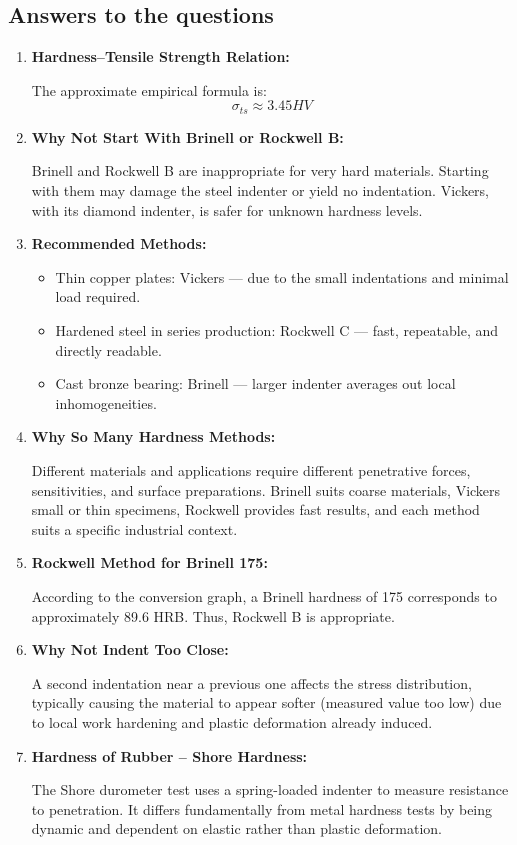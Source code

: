 \documentclass[a4paper]{article}
\begin{document}
  \subsection{Answers to the questions}
  \begin{enumerate}
    \item \textbf{Hardness–Tensile Strength Relation:}
    
    The approximate empirical formula is:
    \begin{equation}
      \sigma _{ts} \approx 3.45 HV
    \end{equation}
    \item \textbf{Why Not Start With Brinell or Rockwell B:}
    
    Brinell and Rockwell B are inappropriate for very hard materials. Starting
    with them may damage the steel indenter or yield no indentation. Vickers,
    with its diamond indenter, is safer for unknown hardness levels.
    \item \textbf{Recommended Methods:}
    
    \begin{itemize}
      \item Thin copper plates: Vickers — due to the small indentations and minimal load required.
      \item Hardened steel in series production: Rockwell C — fast, repeatable, and directly readable.
      \item Cast bronze bearing: Brinell — larger indenter averages out local inhomogeneities.
    \end{itemize}
    \item \textbf{Why So Many Hardness Methods:}
    
    Different materials and applications require different penetrative forces,
    sensitivities, and surface preparations. Brinell suits coarse materials,
    Vickers small or thin specimens, Rockwell provides fast results, and each
    method suits a specific industrial context.
    
    \item \textbf{Rockwell Method for Brinell 175:}
    
    According to the conversion graph, a Brinell hardness of 175 corresponds to
    approximately 89.6 HRB. Thus, Rockwell B is appropriate.

    \item \textbf{Why Not Indent Too Close:}
    
    A second indentation near a previous one affects the stress distribution,
    typically causing the material to appear softer (measured value too low) due
    to local work hardening and plastic deformation already induced.
    
    \item \textbf{Hardness of Rubber – Shore Hardness:}
    
    The Shore durometer test uses a spring-loaded indenter to measure resistance to penetration. It differs fundamentally from metal hardness tests by being dynamic and dependent on elastic rather than plastic deformation\cite{ASTMD2240}.
  \end{enumerate}
\end{document}

